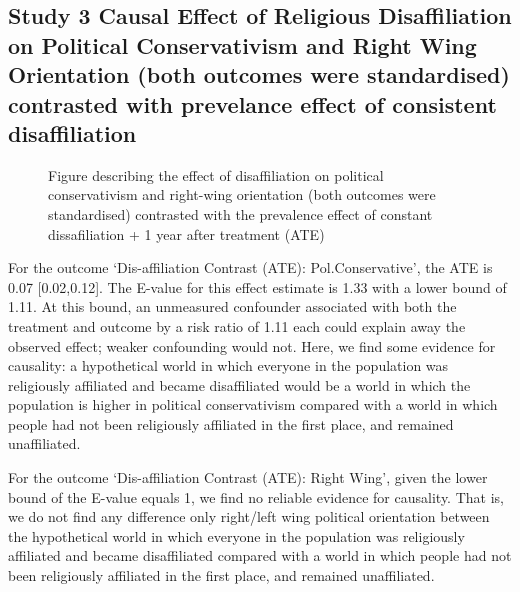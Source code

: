 \documentclass[
  singlecolumn]{article}
\begin{document}
\subsection{Study 3 Causal Effect of Religious Disaffiliation on
Political Conservativism and Right Wing Orientation (both outcomes were
standardised) contrasted with prevelance effect of consistent
disaffiliation}\label{study-3-causal-effect-of-religious-disaffiliation-on-political-conservativism-and-right-wing-orientation-both-outcomes-were-standardised-contrasted-with-prevelance-effect-of-consistent-disaffiliation}

\begin{figure}


\caption{\label{fig-contrast}Figure describing the effect of
disaffiliation on political conservativism and right-wing orientation
(both outcomes were standardised) contrasted with the prevalence effect
of constant dissafiliation + 1 year after treatment (ATE)}

\end{figure}%

\begin{table}

\caption{\label{tbl-att}}

\centering{

\captionsetup{labelsep=none}

}

\end{table}%

For the outcome `Dis-affiliation Contrast (ATE): Pol.Conservative', the
ATE is 0.07 {[}0.02,0.12{]}. The E-value for this effect estimate is
1.33 with a lower bound of 1.11. At this bound, an unmeasured confounder
associated with both the treatment and outcome by a risk ratio of 1.11
each could explain away the observed effect; weaker confounding would
not. Here, we find some evidence for causality: a hypothetical world in
which everyone in the population was religiously affiliated and became
disaffiliated would be a world in which the population is higher in
political conservativism compared with a world in which people had not
been religiously affiliated in the first place, and remained
unaffiliated.

For the outcome `Dis-affiliation Contrast (ATE): Right Wing', given the
lower bound of the E-value equals 1, we find no reliable evidence for
causality. That is, we do not find any difference only right/left wing
political orientation between the hypothetical world in which everyone
in the population was religiously affiliated and became disaffiliated
compared with a world in which people had not been religiously
affiliated in the first place, and remained unaffiliated.
\end{document}
